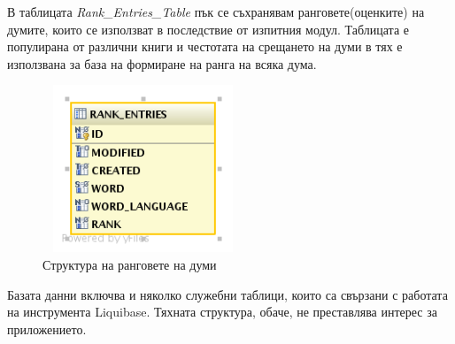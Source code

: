 В таблицата \emph{Rank\_Entries\_Table} пък се съхранявам
ранговете(оценките) на думите, които се използват в последствие от
изпитния модул. Таблицата е популирана от различни книги и честотата
на срещането на думи в тях е използвана за база на формиране на ранга
на всяка дума.

\begin{figure}[htbp]
  \caption{Структура на ранговете на думи}
  \centering
  \includegraphics[width=60mm, height=50mm]{images/rank_entries_table.png}
\end{figure}

Базата данни включва и няколко служебни таблици, които са свързани с
работата на инструмента Liquibase. Тяхната структура, обаче, не
преставлява интерес за приложението.

